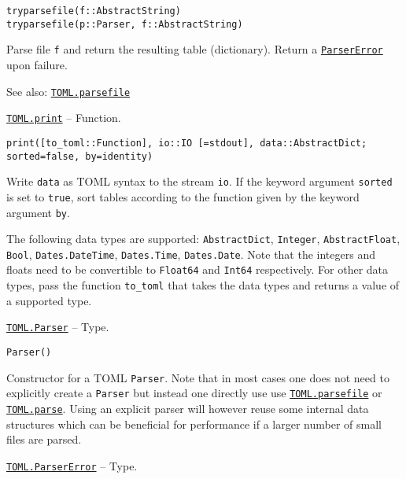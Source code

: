 \begin{adjustwidth}{2em}{0pt}


\begin{verbatim}
tryparsefile(f::AbstractString)
tryparsefile(p::Parser, f::AbstractString)
\end{verbatim}

Parse file \texttt{f} and return the resulting table (dictionary). Return a \hyperlink{704017640374729671}{\texttt{ParserError}} upon failure.

See also: \hyperlink{7810654945362887951}{\texttt{TOML.parsefile}}



\end{adjustwidth}
\hypertarget{14229671440710768222}{}
\hyperlink{14229671440710768222}{\texttt{TOML.print}}  -- {Function.}

\begin{adjustwidth}{2em}{0pt}


\begin{verbatim}
print([to_toml::Function], io::IO [=stdout], data::AbstractDict; sorted=false, by=identity)
\end{verbatim}

Write \texttt{data} as TOML syntax to the stream \texttt{io}. If the keyword argument \texttt{sorted} is set to \texttt{true}, sort tables according to the function given by the keyword argument \texttt{by}.

The following data types are supported: \texttt{AbstractDict}, \texttt{Integer}, \texttt{AbstractFloat}, \texttt{Bool}, \texttt{Dates.DateTime}, \texttt{Dates.Time}, \texttt{Dates.Date}. Note that the integers and floats need to be convertible to \texttt{Float64} and \texttt{Int64} respectively. For other data types, pass the function \texttt{to\_toml} that takes the data types and returns a value of a supported type.



\end{adjustwidth}
\hypertarget{15665944683277360364}{}
\hyperlink{15665944683277360364}{\texttt{TOML.Parser}}  -- {Type.}

\begin{adjustwidth}{2em}{0pt}


\begin{verbatim}
Parser()
\end{verbatim}

Constructor for a TOML \texttt{Parser}.  Note that in most cases one does not need to explicitly create a \texttt{Parser} but instead one directly use use \hyperlink{7810654945362887951}{\texttt{TOML.parsefile}} or \hyperlink{12167785999563676987}{\texttt{TOML.parse}}.  Using an explicit parser will however reuse some internal data structures which can be beneficial for performance if a larger number of small files are parsed.



\end{adjustwidth}
\hypertarget{704017640374729671}{}
\hyperlink{704017640374729671}{\texttt{TOML.ParserError}}  -- {Type.}

